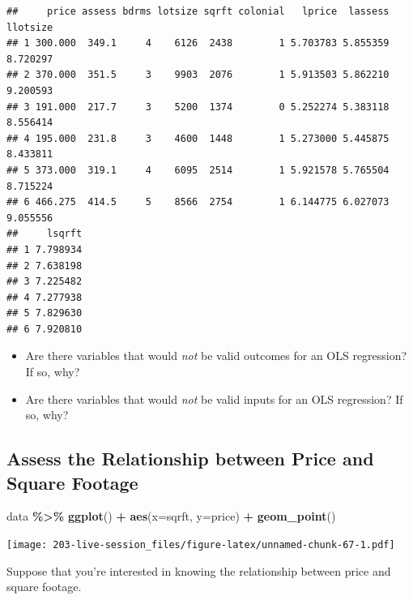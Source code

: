 \documentclass[
]{book}
\newenvironment{Shaded}{\begin{snugshade}}{\end{snugshade}}
\newcommand{\AttributeTok}[1]{\textcolor[rgb]{0.13,0.29,0.53}{#1}}
\newcommand{\FunctionTok}[1]{\textcolor[rgb]{0.13,0.29,0.53}{\textbf{#1}}}
\newcommand{\NormalTok}[1]{#1}
\newcommand{\SpecialCharTok}[1]{\textcolor[rgb]{0.81,0.36,0.00}{\textbf{#1}}}
\providecommand{\tightlist}{%
  \setlength{\itemsep}{0pt}\setlength{\parskip}{0pt}}
\theoremstyle{definition}
\theoremstyle{definition}
\theoremstyle{definition}
\theoremstyle{definition}
\theoremstyle{remark}
\begin{document}
\begin{verbatim}
##     price assess bdrms lotsize sqrft colonial   lprice  lassess llotsize
## 1 300.000  349.1     4    6126  2438        1 5.703783 5.855359 8.720297
## 2 370.000  351.5     3    9903  2076        1 5.913503 5.862210 9.200593
## 3 191.000  217.7     3    5200  1374        0 5.252274 5.383118 8.556414
## 4 195.000  231.8     3    4600  1448        1 5.273000 5.445875 8.433811
## 5 373.000  319.1     4    6095  2514        1 5.921578 5.765504 8.715224
## 6 466.275  414.5     5    8566  2754        1 6.144775 6.027073 9.055556
##     lsqrft
## 1 7.798934
## 2 7.638198
## 3 7.225482
## 4 7.277938
## 5 7.829630
## 6 7.920810
\end{verbatim}

\begin{itemize}
\tightlist
\item
  Are there variables that would \emph{not} be valid outcomes for an OLS regression? If so, why?
\item
  Are there variables that would \emph{not} be valid inputs for an OLS regression? If so, why?
\end{itemize}

\hypertarget{assess-the-relationship-between-price-and-square-footage}{%
\subsection{Assess the Relationship between Price and Square Footage}\label{assess-the-relationship-between-price-and-square-footage}}

\begin{Shaded}
\begin{Highlighting}[]
\NormalTok{data }\SpecialCharTok{\%\textgreater{}\%} 
  \FunctionTok{ggplot}\NormalTok{() }\SpecialCharTok{+} 
  \FunctionTok{aes}\NormalTok{(}\AttributeTok{x=}\NormalTok{sqrft, }\AttributeTok{y=}\NormalTok{price) }\SpecialCharTok{+} 
  \FunctionTok{geom\_point}\NormalTok{()}
\end{Highlighting}
\end{Shaded}

\texttt{[image: 203-live-session\_files/figure-latex/unnamed-chunk-67-1.pdf]}

Suppose that you're interested in knowing the relationship between price and square footage.
\end{document}
